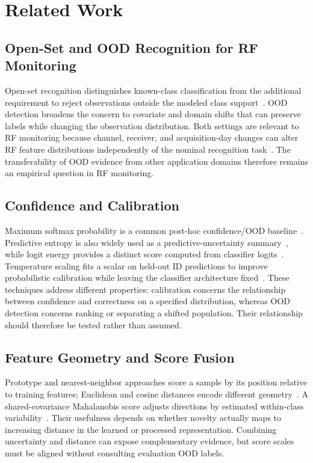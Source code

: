 \section{Related Work}
\label{sec:related-work}

\subsection{Open-Set and OOD Recognition for RF Monitoring}

Open-set recognition distinguishes known-class classification from the additional requirement to reject observations outside the modeled class support~\cite{scheirer2013toward,geng2021recent}. OOD detection broadens the concern to covariate and domain shifts that can preserve labels while changing the observation distribution. Both settings are relevant to RF monitoring because channel, receiver, and acquisition-day changes can alter RF feature distributions independently of the nominal recognition task~\cite{alshawabka2020exposing,hanna2022wisig}. The transferability of OOD evidence from other application domains therefore remains an empirical question in RF monitoring.

\subsection{Confidence and Calibration}

Maximum softmax probability is a common post-hoc confidence/OOD baseline~\cite{hendrycks2017baseline}. Predictive entropy is also widely used as a predictive-uncertainty summary~\cite{ovadia2019trust}, while logit energy provides a distinct score computed from classifier logits~\cite{liu2020energy}. Temperature scaling fits a scalar on held-out ID predictions to improve probabilistic calibration while leaving the classifier architecture fixed~\cite{guo2017calibration}. These techniques address different properties: calibration concerns the relationship between confidence and correctness on a specified distribution, whereas OOD detection concerns ranking or separating a shifted population. Their relationship should therefore be tested rather than assumed.

\subsection{Feature Geometry and Score Fusion}

Prototype and nearest-neighbor approaches score a sample by its position relative to training features; Euclidean and cosine distances encode different geometry~\cite{snell2017prototypical,sun2022knn}. A shared-covariance Mahalanobis score adjusts directions by estimated within-class variability~\cite{lee2018mahalanobis}. Their usefulness depends on whether novelty actually maps to increasing distance in the learned or processed representation. Combining uncertainty and distance can expose complementary evidence, but score scales must be aligned without consulting evaluation OOD labels.

